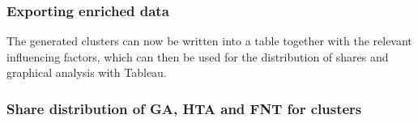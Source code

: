 \documentclass[
]{article}
\newenvironment{Shaded}{\begin{snugshade}}{\end{snugshade}}
\newcommand{\AttributeTok}[1]{\textcolor[rgb]{0.77,0.63,0.00}{#1}}
\newcommand{\CommentTok}[1]{\textcolor[rgb]{0.56,0.35,0.01}{\textit{#1}}}
\newcommand{\FunctionTok}[1]{\textcolor[rgb]{0.00,0.00,0.00}{#1}}
\newcommand{\NormalTok}[1]{#1}
\newcommand{\OtherTok}[1]{\textcolor[rgb]{0.56,0.35,0.01}{#1}}
\newcommand{\SpecialCharTok}[1]{\textcolor[rgb]{0.00,0.00,0.00}{#1}}
\newcommand{\StringTok}[1]{\textcolor[rgb]{0.31,0.60,0.02}{#1}}
\begin{document}
\hypertarget{exporting-enriched-data-1}{%
\subsubsection{Exporting enriched
data}\label{exporting-enriched-data-1}}

The generated clusters can now be written into a table together with the
relevant influencing factors, which can then be used for the
distribution of shares and graphical analysis with Tableau.

\begin{Shaded}
\end{Shaded}

\hypertarget{share-distribution-of-ga-hta-and-fnt-for-clusters-1}{%
\subsubsection{Share distribution of GA, HTA and FNT for
clusters}\label{share-distribution-of-ga-hta-and-fnt-for-clusters-1}}
\end{document}
